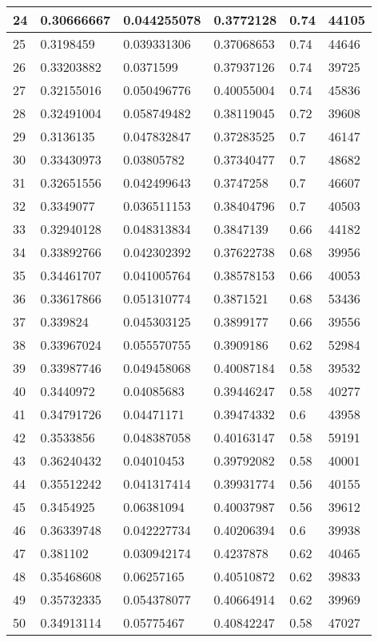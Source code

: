 \begin{longtable}{|l|l|l|l|l|l|}
24 & 0.30666667 & 0.044255078 & 0.3772128 & 0.74 & 44105 \\ \hline 
25 & 0.3198459 & 0.039331306 & 0.37068653 & 0.74 & 44646 \\ \hline 
26 & 0.33203882 & 0.0371599 & 0.37937126 & 0.74 & 39725 \\ \hline 
27 & 0.32155016 & 0.050496776 & 0.40055004 & 0.74 & 45836 \\ \hline 
28 & 0.32491004 & 0.058749482 & 0.38119045 & 0.72 & 39608 \\ \hline 
29 & 0.3136135 & 0.047832847 & 0.37283525 & 0.7 & 46147 \\ \hline 
30 & 0.33430973 & 0.03805782 & 0.37340477 & 0.7 & 48682 \\ \hline 
31 & 0.32651556 & 0.042499643 & 0.3747258 & 0.7 & 46607 \\ \hline 
32 & 0.3349077 & 0.036511153 & 0.38404796 & 0.7 & 40503 \\ \hline 
33 & 0.32940128 & 0.048313834 & 0.3847139 & 0.66 & 44182 \\ \hline 
34 & 0.33892766 & 0.042302392 & 0.37622738 & 0.68 & 39956 \\ \hline 
35 & 0.34461707 & 0.041005764 & 0.38578153 & 0.66 & 40053 \\ \hline 
36 & 0.33617866 & 0.051310774 & 0.3871521 & 0.68 & 53436 \\ \hline 
37 & 0.339824 & 0.045303125 & 0.3899177 & 0.66 & 39556 \\ \hline 
38 & 0.33967024 & 0.055570755 & 0.3909186 & 0.62 & 52984 \\ \hline 
39 & 0.33987746 & 0.049458068 & 0.40087184 & 0.58 & 39532 \\ \hline 
40 & 0.3440972 & 0.04085683 & 0.39446247 & 0.58 & 40277 \\ \hline 
41 & 0.34791726 & 0.04471171 & 0.39474332 & 0.6 & 43958 \\ \hline 
42 & 0.3533856 & 0.048387058 & 0.40163147 & 0.58 & 59191 \\ \hline 
43 & 0.36240432 & 0.04010453 & 0.39792082 & 0.58 & 40001 \\ \hline 
44 & 0.35512242 & 0.041317414 & 0.39931774 & 0.56 & 40155 \\ \hline 
45 & 0.3454925 & 0.06381094 & 0.40037987 & 0.56 & 39612 \\ \hline 
46 & 0.36339748 & 0.042227734 & 0.40206394 & 0.6 & 39938 \\ \hline 
47 & 0.381102 & 0.030942174 & 0.4237878 & 0.62 & 40465 \\ \hline 
48 & 0.35468608 & 0.06257165 & 0.40510872 & 0.62 & 39833 \\ \hline 
49 & 0.35732335 & 0.054378077 & 0.40664914 & 0.62 & 39969 \\ \hline 
50 & 0.34913114 & 0.05775467 & 0.40842247 & 0.58 & 47027 \\ \hline 
\end{longtable}